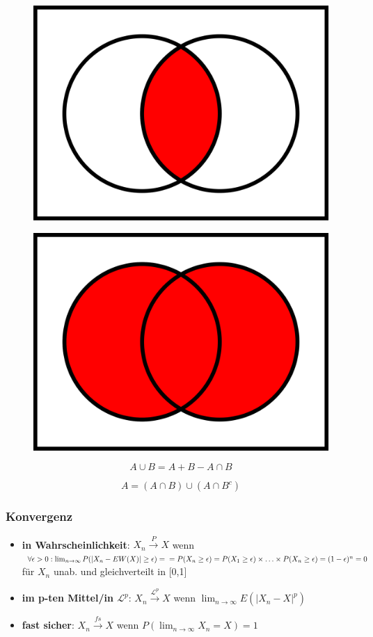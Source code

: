 \begin{figure}[ht]
    \centering
    \begin{minipage}{.5\textwidth}
      \centering
      \includegraphics[width=.4\linewidth]{mehrdimWktrechnung/Venn0001.svg.png}
      \label{fig:schnittmenge}
    \end{minipage}%
    \begin{minipage}{.5\textwidth}
      \centering
      \includegraphics[width=.4\linewidth]{mehrdimWktrechnung/Venn0111.svg.png}
      \label{fig:vereinigungsmenge}
    \end{minipage}
\end{figure}

\begin{equation*}
    A\cup B = A+B-A\cap B
\end{equation*}

\begin{equation*}
    A = (A\cap B) \cup (A\cap B^c)
\end{equation*}

\subsubsection{Konvergenz}

\begin{itemize}
    \item \textbf{in Wahrscheinlichkeit}: \(X_n \xrightarrow{P} X\) wenn \(\forall \epsilon > 0: \lim_{n\rightarrow\infty}P(|X_n-EW(X)| \geq\epsilon)=\\=P(X_n \geq\epsilon)=P(X_1\geq\epsilon)\times \hdots \times P(X_n\geq\epsilon)=(1-\epsilon)^n = 0\) für \(X_n\) unab. und gleichverteilt in [0,1]
    \item \textbf{im p-ten Mittel/in \(\mathcal{L}^p\)}: \(X_n \xrightarrow{\mathcal{L}^p} X\) wenn \(\lim_{n\rightarrow\infty}E(|X_n-X|^p)\)
    \item \textbf{fast sicher}: \(X_n \xrightarrow{fs} X\) wenn \(P(\lim_{n\rightarrow\infty}X_n=X)=1\)
\end{itemize}

